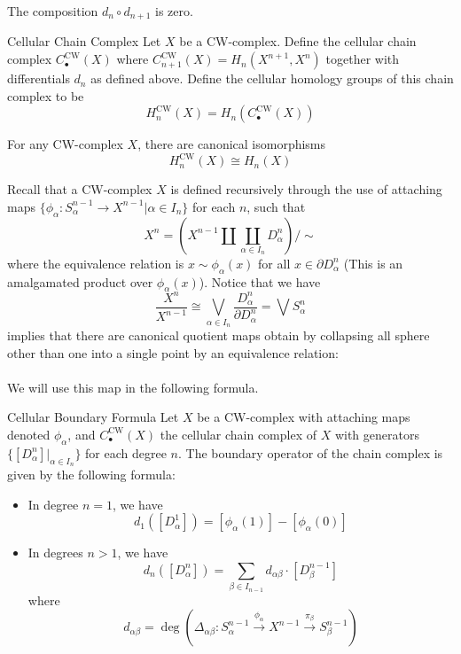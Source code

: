 \documentclass[a4paper]{article}
\begin{document}
\begin{lmm}{}{} The composition $d_n\circ d_{n+1}$ is zero. 
\end{lmm}

\begin{defn}{Cellular Chain Complex}{} Let $X$ be a CW-complex. Define the cellular chain complex $C_\bullet^\text{CW}(X)$ where $C_{n+1}^{\text{CW}}(X)=H_n(X^{n+1},X^n)$ together with differentials $d_n$ as defined above. Define the cellular homology groups of this chain complex to be $$H_n^\text{CW}(X)=H_n(C_\bullet^\text{CW}(X))$$
\end{defn}

\begin{lmm}{}{} For any CW-complex $X$, there are canonical isomorphisms $$H_n^\text{CW}(X)\cong H_n(X)$$
\end{lmm}

Recall that a CW-complex $X$ is defined recursively through the use of attaching maps $\{\phi_\alpha:S_\alpha^{n-1}\to X^{n-1}|\alpha\in I_n\}$ for each $n$, such that $$X^n=\left(X^{n-1}\amalg\coprod_{\alpha\in I_n}D_\alpha^n\right)/\sim$$ where the equivalence relation is $x\sim\phi_\alpha(x)$ for all $x\in\partial D_\alpha^n$ (This is an amalgamated product over $\phi_\alpha(x)$). Notice that we have $$\frac{X^n}{X^{n-1}}\cong\bigvee_{\alpha\in I_n}\frac{D_\alpha^n}{\partial D_\alpha^n}=\bigvee S_\alpha^n$$ implies that there are canonical quotient maps obtain by collapsing all sphere other than one into a single point by an equivalence relation: \\~\\
 We will use this map in the following formula. 

\begin{thm}{Cellular Boundary Formula}{} Let $X$ be a CW-complex with attaching maps denoted $\phi_\alpha$, and $C_\bullet^\text{CW}(X)$ the cellular chain complex of $X$ with generators $\{[D_\alpha^n]|_{\alpha\in I_n}\}$ for each degree $n$. The boundary operator of the chain complex is given by the following formula: 
\begin{itemize}
\item In degree $n=1$, we have $$d_1\left([D_\alpha^1]\right)=[\phi_\alpha(1)]-[\phi_\alpha(0)]$$
\item In degrees $n>1$, we have $$d_n\left([D_\alpha^n]\right)=\sum_{\beta\in I_{n-1}}d_{\alpha\beta}\cdot[D_\beta^{n-1}]$$ where $$d_{\alpha\beta}=\deg\left(\Delta_{\alpha\beta}:S_\alpha^{n-1}\overset{\phi_\alpha}{\rightarrow}X^{n-1}\overset{\pi_\beta}{\rightarrow}S_\beta^{n-1}\right)$$
\end{itemize}
\end{thm}
\end{document}

